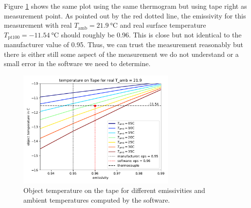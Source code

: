 Figure \ref{fig:softwareTape} shows the same plot using the same thermogram but using tape right as measurement point. As pointed out by the red dotted line, the emissivity for this measurement with real $T_\text{amb}=\SI{21.9}{\degreeCelsius}$ and real surface temperature $T_\text{pt100} = \SI{-11.54}{\degreeCelsius}$ should roughly be \SI{0.96}{}. This is close but not identical to the manufacturer value of \SI{0.95}{}. Thus, we can trust the measurement reasonably but there is either still some aspect of the measurement we do not understand or a small error in the software we need to determine.
\begin{figure}[h!]
	\centering
	\includegraphics[width=0.7\textwidth]{img/softwareTape.pdf}
	\caption{Object temperature on the tape for different emissivities and ambient temperatures computed by the software.}
	\label{fig:softwareTape}
\end{figure} \\


